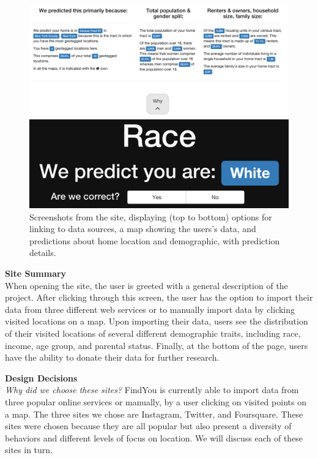\begin{figure}
  \includegraphics[width=\linewidth]{fig/findyou/home-detail.png}

  \includegraphics[width=\linewidth]{fig/findyou/race.png}
  \caption{Screenshots from the site, displaying (top to bottom) options for linking to data sources, a map showing the users's data, and predictions about home location and demographic, with prediction details.}
  \label{fig:findyou_screencap}
\end{figure}

\textbf{Site Summary} \\
When opening the site, the user is greeted with a general description of the project. After clicking through this screen, the user has the option to import their data from three different web services or to manually import data by clicking visited locations on a map. Upon importing their data, users see the distribution of their visited locations of several different demographic traits, including race, income, age group, and parental status. Finally, at the bottom of the page, users have the ability to donate their data for further research.

\textbf{Design Decisions} \\
\emph{Why did we choose these sites?}
FindYou is currently able to import data from three popular online services or manually, by a user clicking on visited points on a map. The three sites we chose are Instagram, Twitter, and Foursquare. These sites were chosen because they are all popular but also present a diversity of behaviors and different levels of focus on location. We will discuss each of these sites in turn.

